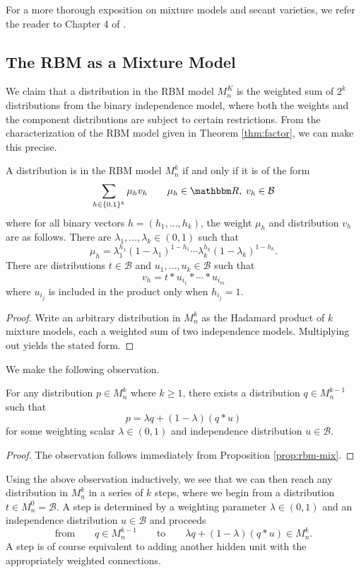 \documentclass[11pt,titlepage]{article}
\newcommand*{\Bin}{\mathcal{B}}
\numberwithin{equation}{section}
\begin{document}
    For a more thorough exposition on mixture models and secant varieties, we
    refer the reader to Chapter 4 of \cite{DSS08}.

\subsection{The RBM as a Mixture Model}

    We claim that a distribution in the RBM model $M_n^K$ is the weighted sum of
    $2^k$ distributions from the binary independence model, where both the
    weights and the component distributions are subject to certain restrictions.
    From the characterization of the RBM model given in Theorem
    \ref{thm:factor}, we can make this precise.
    \begin{proposition}\label{prop:rbm-mix}
    A distribution is in the RBM model $M_n^k$ if and only if it is of the form
    \[
        \sum_{h \in \{0,1\}^k} \mu_h v_h
        \qquad
        \mu_h \in \R, \;
        v_h \in \Bin
    \]
    where for all binary vectors $h = (h_1, \ldots, h_k)$, the weight $\mu_h$
    and distribution $v_h$ are as follows.  There are $\lambda_1, \ldots,
    \lambda_k \in (0,1)$ such that
    \[
        \mu_h = \lambda_1^{h_1}(1 - \lambda_1)^{1-h_1} \cdots
        \lambda_k^{h_k}(1-\lambda_k)^{1-h_k}.
    \]
    There are distributions $t \in \Bin$ and $u_1, \ldots, u_k \in \Bin$ such
    that
    \[
        v_h = t * u_{i_1} * \cdots * u_{i_m}
    \]
    where $u_{i_j}$ is included in the product only when $h_{i_j} = 1$.
    \end{proposition}
    \begin{proof}
        Write an arbitrary distribution in $M_n^k$ as the Hadamard product of
        $k$ mixture models, each a weighted sum of two independence models.
        Multiplying out yields the stated form.
    \end{proof}

    We make the following observation.
    \begin{proposition}
        For any distribution $p \in M_n^k$ where $k \ge 1$, there exists a
        distribution $q \in M_n^{k-1}$ such that
        \[
            p = \lambda q + (1 - \lambda)(q * u)
        \]
        for some weighting scalar $\lambda \in (0,1)$ and independence
        distribution $u \in \Bin$.
    \end{proposition}
    \begin{proof}
        The observation follows immediately from Proposition \ref{prop:rbm-mix}.
    \end{proof}
    Using the above observation inductively, we see that we can then reach any
    distribution in $M_n^k$ in a series of $k$ steps, where we begin from a
    distribution $t \in M_n^0 = \Bin$.  A step is determined by a weighting
    parameter $\lambda \in (0,1)$ and an independence distribution $u \in \Bin$
    and proceeds
    \[
        \text{from}\qquad q \in M_n^{k-1}
        \qquad\text{to}\qquad
        \lambda q + (1 - \lambda)(q * u) \in M_n^k.
    \]
    A step is of course equivalent to adding another hidden unit with the
    appropriately weighted connections.
\end{document}
